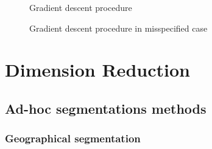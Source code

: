 \documentclass[../../Main_ManuscritThese.tex]{subfiles}
\newcommand\imgpath{/home/victor/acadwriting/Manuscrit/Text/Chapter5/img/}
\begin{document}
 \begin{figure}[ht]
  \centering
  
  \caption{\label{fig:ctrl_true} Gradient descent procedure}
\end{figure}

 \begin{figure}[ht]
  \centering
  
  \caption{\label{fig:ctrl_0_001} Gradient descent procedure in misspecified case}
\end{figure}


\section{Dimension Reduction}

\subsection{Ad-hoc segmentations methods}



\subsubsection{Geographical segmentation}


%   

%   







\subfileLocal{
	\pagestyle{empty}
	
	
}
\end{document}

